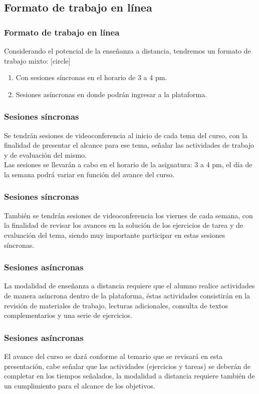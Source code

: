 \subsection{Formato de trabajo en línea}
\begin{frame}
\frametitle{Formato de trabajo en línea}
Considerando el potencial de la enseñanza a distancia, tendremos un formato de trabajo mixto:
[circle]
\begin{enumerate}[<+->]
\item Con sesiones síncronas en el horario de 3 a 4 pm.
\item Sesiones asíncronas en donde podrán ingresar a la plataforma.
\end{enumerate}
\end{frame}
\begin{frame}
\frametitle{Sesiones síncronas}
Se tendrán sesiones de videoconferencia al inicio de cada tema del curso, con la finalidad de presentar el alcance para ese tema, señalar las actividades de trabajo y de evaluación del mismo.
\\
\bigskip
Las sesiones se llevarán a cabo en el horario de la asignatura: 3 a 4 pm, el día de la semana podrá variar en función del avance del curso. 
\end{frame}
\begin{frame}
\frametitle{Sesiones síncronas}
También se tendrán sesiones de videoconferencia los viernes de cada semana, con la finalidad de revisar los avances en la solución de los ejercicios de tarea y de evaluación del tema, siendo muy importante participar en estas sesiones síncronas.
\end{frame}
\begin{frame}
\frametitle{Sesiones asíncronas}
La modalidad de enseñanza a distancia requiere que el alumno realice actividades de manera asíncrona dentro de la plataforma, éstas actividades consistirán en la revisión de materiales de trabajo, lecturas adicionales, consulta de textos complementarios y una serie de ejercicios.
\end{frame}
\begin{frame}
\frametitle{Sesiones asíncronas}
El avance del curso se dará conforme al temario que se revisará en esta presentación, cabe señalar que las actividades (ejercicios y tareas) se deberán de completar en los tiempos señalados, la modalidad a distancia requiere también de un cumplimiento para el alcance de los objetivos.
\end{frame}
{

}
